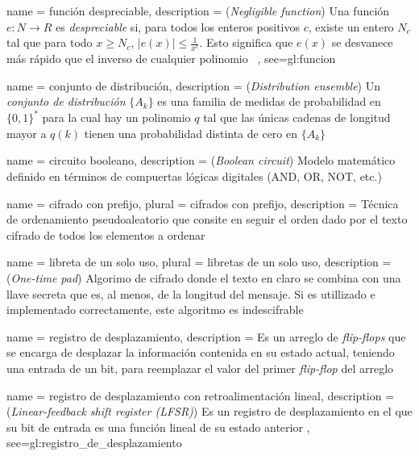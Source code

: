 {
  name = función despreciable,
  description = {
    (\textit{Negligible function}) Una función $ e: N \rightarrow R $ es
    \textit{despreciable} si, para todos los enteros positivos $ c $,
    existe un entero $ N_c $ tal que para todo $ x \ge N_c $,
    $ |e(x)| \le \frac{1}{x^c} $. Esto significa que $ e(x) $ se desvanece
    más rápido que el inverso de cualquier
    polinomio~\cite{DBLP:conf/stoc/BeaverMR90}%
  },
  see={gl:funcion}
}

{
  name = conjunto de distribución,
  description = {
    (\textit{Distribution ensemble}) Un \textit{conjunto de distribución}
    $ \{ A_k \} $ es una familia de medidas de probabilidad en $ \{0, 1\}^* $
    para la cual hay un polinomio $ q $ tal que las únicas cadenas de longitud
    mayor a $ q(k) $ tienen una probabilidad distinta de cero en
    $ \{ A_k \} $~\cite{DBLP:conf/stoc/BeaverMR90}%
  }
}

{
  name = circuito booleano,
  description = {
    (\textit{Boolean circuit}) Modelo matemático definido en términos de
    compuertas lógicas digitales (AND, OR, NOT, etc.)%
  }
}

{
  name = cifrado con prefijo,
  plural = cifrados con prefijo,
  description = {
    Técnica de ordenamiento pseudoaleatorio que consite en seguir el orden dado
    por el texto cifrado de todos los elementos a ordenar%
  }
}

{
  name = libreta de un solo uso,
  plural = libretas de un solo uso,
  description = {
    (\textit{One-time pad}) Algorimo de cifrado donde el texto en claro se combina
    con una llave secreta que es, al menos, de la longitud del mensaje. Si es
    utillizado e implementado correctamente, este algoritmo es indescifrable%
  }
}

{
  name = registro de desplazamiento,
  description = {
    Es un arreglo de \textit{flip-flops} que se encarga de desplazar la
    información contenida en su estado actual, teniendo una entrada de un
    bit, para reemplazar el valor del primer \textit{flip-flop} del arreglo%
  }
}

{
  name = registro de desplazamiento con retroalimentación lineal,
  description = {
    (\textit{Linear-feedback shift register (LFSR)}) Es un registro de
    desplazamiento en el que su bit de entrada es una función lineal de su
    estado anterior%
  },
  see={gl:registro_de_desplazamiento}
}

